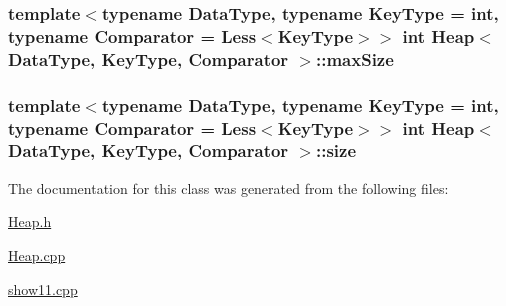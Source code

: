 \hypertarget{class_heap_a7f8e5c3cc64b8799b4e75b5a0f675e69}{
\subsubsection[{max\-Size}]{\setlength{\rightskip}{0pt plus 5cm}template$<$typename \-Data\-Type, typename \-Key\-Type = int, typename \-Comparator = \-Less$<$\-Key\-Type$>$$>$ int {\bf \-Heap}$<$ \-Data\-Type, \-Key\-Type, \-Comparator $>$\-::{\bf max\-Size}}}\label{class_heap_a7f8e5c3cc64b8799b4e75b5a0f675e69}
\hypertarget{class_heap_a0964c2d309605bee2f6f1a9cee9ab89a}{
\subsubsection[{size}]{\setlength{\rightskip}{0pt plus 5cm}template$<$typename \-Data\-Type, typename \-Key\-Type = int, typename \-Comparator = \-Less$<$\-Key\-Type$>$$>$ int {\bf \-Heap}$<$ \-Data\-Type, \-Key\-Type, \-Comparator $>$\-::{\bf size}}}\label{class_heap_a0964c2d309605bee2f6f1a9cee9ab89a}


\-The documentation for this class was generated from the following files\-:\begin{DoxyCompactItemize}
\item 
\hyperlink{_heap_8h}{\-Heap.\-h}\item 
\hyperlink{_heap_8cpp}{\-Heap.\-cpp}\item 
\hyperlink{show11_8cpp}{show11.\-cpp}\end{DoxyCompactItemize}
